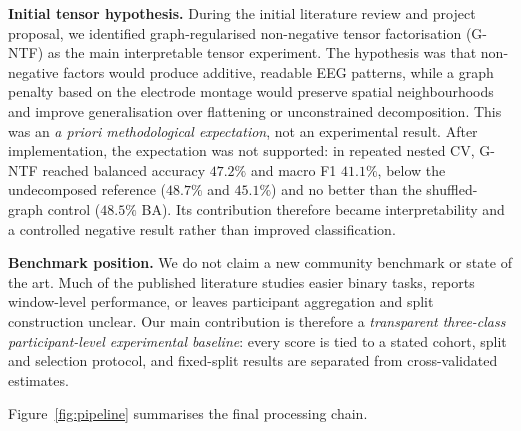 \documentclass[10pt,twocolumn,a4paper]{article}
\begin{document}
\noindent\textbf{Initial tensor hypothesis.} During the initial literature review and project proposal, we identified graph-regularised non-negative tensor factorisation (G-NTF) as the main interpretable tensor experiment. The hypothesis was that non-negative factors would produce additive, readable EEG patterns, while a graph penalty based on the electrode montage would preserve spatial neighbourhoods and improve generalisation over flattening or unconstrained decomposition. This was an \emph{a priori methodological expectation}, not an experimental result. After implementation, the expectation was not supported: in repeated nested CV, G-NTF reached balanced accuracy $47.2\%$ and macro F1 $41.1\%$, below the undecomposed reference ($48.7\%$ and $45.1\%$) and no better than the shuffled-graph control ($48.5\%$ BA). Its contribution therefore became interpretability and a controlled negative result rather than improved classification.

\noindent\textbf{Benchmark position.} We do not claim a new community benchmark or state of the art. Much of the published literature studies easier binary tasks, reports window-level performance, or leaves participant aggregation and split construction unclear. Our main contribution is therefore a \emph{transparent three-class participant-level experimental baseline}: every score is tied to a stated cohort, split and selection protocol, and fixed-split results are separated from cross-validated estimates.

Figure~\ref{fig:pipeline} summarises the final processing chain.
\end{document}
